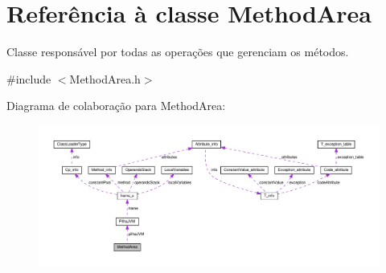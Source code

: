 \hypertarget{classMethodArea}{}\section{Referência à classe Method\+Area}
\label{classMethodArea}


Classe responsável por todas as operações que gerenciam os métodos.  




{\ttfamily \#include $<$Method\+Area.\+h$>$}



Diagrama de colaboração para Method\+Area\+:
\nopagebreak
\begin{figure}[H]
\begin{center}
\leavevmode
\includegraphics[width=350pt]{classMethodArea__coll__graph}
\end{center}
\end{figure}
